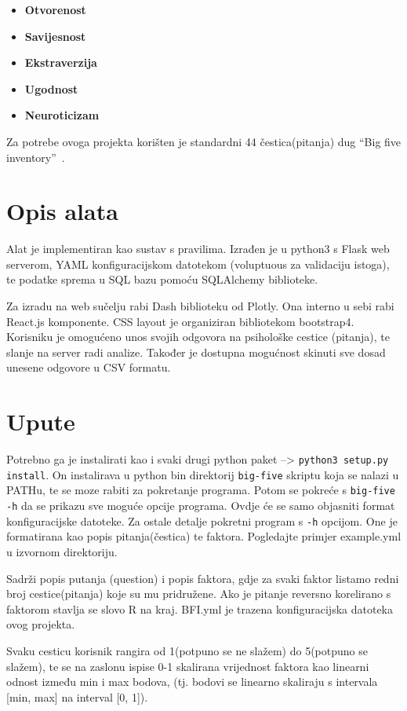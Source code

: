 \documentclass[times, utf8, seminar]{fer}
\begin{document}
\begin{itemize}
    \item \textbf{Otvorenost}
    \item \textbf{Savijesnost}
    \item \textbf{Ekstraverzija}
    \item \textbf{Ugodnost}
    \item \textbf{Neuroticizam}
\end{itemize}

Za potrebe ovoga projekta korišten je standardni 44 čestica(pitanja) dug ``Big five inventory''~\cite{john1999big}.

\chapter{Opis alata}
Alat je implementiran kao sustav s pravilima.
Izrađen je u python3 s Flask web serverom, YAML konfiguracijskom datotekom (voluptuous za validaciju istoga), te podatke sprema u SQL bazu pomoću SQLAlchemy biblioteke.

Za izradu na web sučelju rabi Dash biblioteku od Plotly.
Ona interno u sebi rabi React.js komponente.
CSS layout je organiziran bibliotekom bootstrap4.
Korisniku je omogućeno unos svojih odgovora na psihološke cestice (pitanja), te slanje na server radi analize.
Također je dostupna mogućnost skinuti sve dosad unesene odgovore u CSV formatu.
\chapter{Upute}

Potrebno ga je instalirati kao i svaki drugi python paket --> \texttt{python3 setup.py install}.
On instalirava u python bin direktorij \texttt{big-five} skriptu koja se nalazi u PATHu, te se moze rabiti za pokretanje programa.
Potom se pokreće s \texttt{big-five -h} da se prikazu sve moguće opcije programa.
Ovdje će se samo objasniti format konfiguracijske datoteke. Za ostale detalje pokretni program s \texttt{-h} opcijom.
One je formatirana kao popis pitanja(čestica) te faktora. Pogledajte primjer example.yml u izvornom direktoriju.

Sadrži popis putanja (question) i popis faktora, gdje za svaki faktor listamo redni broj cestice(pitanja) koje su mu pridružene. Ako je pitanje reversno korelirano s faktorom stavlja se slovo R na kraj.
BFI.yml je trazena konfiguracijska datoteka ovog projekta.

Svaku cesticu korisnik rangira od 1(potpuno se ne slažem) do 5(potpuno se slažem), te se na zaslonu ispise 0-1 skalirana vrijednost faktora kao linearni odnost između min i max bodova, (tj. bodovi se linearno skaliraju s intervala [min, max] na interval [0, 1]).
\end{document}
